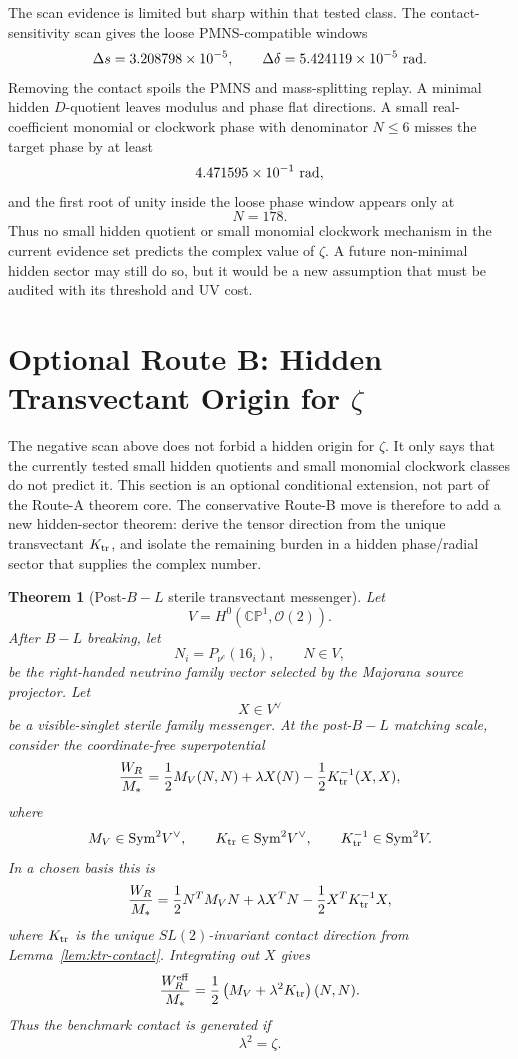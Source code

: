 \documentclass[
  aps,
  prd,
  preprint,
  nofootinbib,
  superscriptaddress,
  longbibliography
]{revtex4-2}
\newcommand{\CP}{\mathbb{CP}}
\newcommand{\cO}{\mathcal{O}}
\newtheorem{theorem}{Theorem}[section]
\begin{document}
The scan evidence is limited but sharp within that tested class.  The
contact-sensitivity scan gives the loose PMNS-compatible windows
\[
  \Delta s=3.208798\times10^{-5},\qquad
  \Delta\delta=5.424119\times10^{-5}\ {\rm rad}.
\]
Removing the contact spoils the PMNS and mass-splitting replay.  A minimal
hidden \(D\)-quotient leaves modulus and phase flat directions.  A small
real-coefficient monomial or clockwork phase with denominator \(N\le6\) misses
the target phase by at least
\[
  4.471595\times10^{-1}\ {\rm rad},
\]
and the first root of unity inside the loose phase window appears only at
\[
  N=178.
\]
Thus no small hidden quotient or small monomial clockwork mechanism in the
current evidence set predicts the complex value of \(\zeta\).  A future
non-minimal hidden sector may still do so, but it would be a new assumption
that must be audited with its threshold and UV cost.

\section{\texorpdfstring{Optional Route B: Hidden Transvectant Origin for \(\zeta\)}{Optional Route B: Hidden Transvectant Origin for zeta}}

The negative scan above does not forbid a hidden origin for \(\zeta\).  It only
says that the currently tested small hidden quotients and small monomial
clockwork classes do not predict it.  This section is an optional conditional
extension, not part of the Route-A theorem core.  The conservative Route-B move is
therefore to add a new hidden-sector theorem: derive the tensor direction from
the unique transvectant \(K_{\rm tr}\), and isolate the remaining burden in a
hidden phase/radial sector that supplies the complex number.

\begin{theorem}[Post-\(B-L\) sterile transvectant messenger]
Let
\[
  V=H^0(\CP^1,\cO(2)).
\]
After \(B-L\) breaking, let
\[
  N_i=P_{\nu^c}(16_i),\qquad N\in V,
\]
be the right-handed neutrino family vector selected by the Majorana source
projector.  Let
\[
  X\in V^\vee
\]
be a visible-singlet sterile family messenger.  At the post-\(B-L\) matching
scale, consider the coordinate-free superpotential
\[
  \frac{W_R}{M_*}
  =
  \frac12 M_V(N,N)
  +\lambda X(N)
  -\frac12 K_{\rm tr}^{-1}(X,X),
\]
where
\[
  M_V\in\mathrm{Sym}^2V^\vee,\qquad
  K_{\rm tr}\in\mathrm{Sym}^2V^\vee,\qquad
  K_{\rm tr}^{-1}\in\mathrm{Sym}^2V.
\]
In a chosen basis this is
\[
  \frac{W_R}{M_*}
  =
  \frac12 N^T M_V N
  +\lambda X^T N
  -\frac12 X^T K_{\rm tr}^{-1}X,
\]
where \(K_{\rm tr}\) is the unique \(SL(2)\)-invariant contact direction from
Lemma~\ref{lem:ktr-contact}.  Integrating out \(X\) gives
\[
  \frac{W_R^{\rm eff}}{M_*}
  =
  \frac12\left(M_V+\lambda^2K_{\rm tr}\right)(N,N).
\]
Thus the benchmark contact is generated if
\[
  \lambda^2=\zeta.
\]
\end{theorem}
\end{document}
